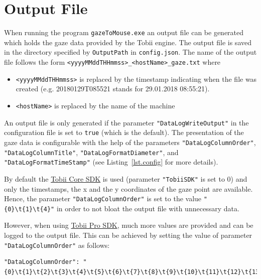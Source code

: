 \documentclass[a4paper,oneside]{book}
\begin{document}
\section{Output File}
When running the program \texttt{gazeToMouse.exe} an output file can be generated which holds the gaze data provided by the Tobii engine.
The output file is saved in the directory specified by \texttt{OutputPath} in \texttt{config.json}.
The name of the output file follows the form \texttt{<yyyyMMddTHHmmss>\_<hostName>\_gaze.txt} where

\begin{itemize}
    \item \texttt{<yyyyMMddTHHmmss>} is replaced by the timestamp indicating when the file was created (e.g. 20180129T085521 stands for 29.01.2018 08:55:21).
    \item \texttt{<hostName>} is replaced by the name of the machine
\end{itemize}

An output file is only generated if the parameter \texttt{"DataLogWriteOutput"} in the configuration file is set to \texttt{true} (which is the default).
The presentation of the gaze data is configurable with the help of the parameters \texttt{"DataLogColumnOrder"}, \texttt{"DataLogColumnTitle"}, \texttt{"DataLogFormatDiameter"}, and \texttt{"DataLogFormatTimeStamp"} (see Listing~\ref{lst.config} for more details).

By default the \href{http://developer.tobii.com/tobii-core-sdk/}{Tobii Core SDK} is used (parameter \texttt{"TobiiSDK"} is set to 0) and only the timestamps, the x and the y coordinates of the gaze point are available.
Hence, the parameter \texttt{"DataLogColumnOrder"} is set to the value \texttt{"\{0\}\textbackslash t\{1\}\textbackslash t\{4\}"} in order to not bloat the output file with unnecessary data.

However, when using \href{http://developer.tobii.com/tobii-pro-sdk/}{Tobii Pro SDK}, much more values are provided and can be logged to the output file.
This can be achieved by setting the value of parameter \texttt{"DataLogColumnOrder"} as follows:
\begin{lstlisting}
"DataLogColumnOrder": "{0}\t{1}\t{2}\t{3}\t{4}\t{5}\t{6}\t{7}\t{8}\t{9}\t{10}\t{11}\t{12}\t{13}"
\end{lstlisting}
\end{document}
